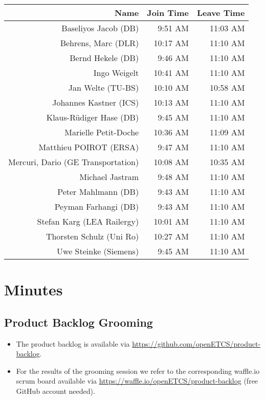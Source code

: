 \documentclass[a4paper, 11pt]{article}
\begin{document}
\begin{table}[htbp]
    \begin{tabular}{rrr}
    \toprule
    \textbf{Name} & \textbf{Join Time} & \textbf{Leave Time} \\
    \midrule
     Baseliyos Jacob (DB) & 9:51 AM & 11:03 AM \\
     Behrens, Marc (DLR) & 10:17 AM & 11:10 AM \\
     Bernd Hekele (DB) & 9:46 AM & 11:10 AM \\
     Ingo Weigelt & 10:41 AM & 11:10 AM \\
     Jan Welte (TU-BS) & 10:10 AM & 10:58 AM \\
     Johannes Kastner (ICS) & 10:13 AM & 11:10 AM \\
     Klaus-R\"udiger Hase (DB) & 9:45 AM & 11:10 AM \\
     Marielle Petit-Doche & 10:36 AM & 11:09 AM \\
     Matthieu POIROT (ERSA) & 9:47 AM & 11:10 AM \\
     Mercuri, Dario (GE Transportation) & 10:08 AM & 10:35 AM \\
     Michael Jastram & 9:48 AM & 11:10 AM \\
     Peter Mahlmann (DB) & 9:43 AM & 11:10 AM \\
     Peyman Farhangi (DB) & 9:43 AM & 11:10 AM \\
     Stefan Karg (LEA Railergy) & 10:01 AM & 11:10 AM \\
     Thorsten Schulz (Uni Ro) & 10:27 AM & 11:10 AM \\
     Uwe Steinke (Siemens) & 9:45 AM & 11:10 AM \\
     \bottomrule
    \end{tabular}%
  \label{tab:addlabel}%
\end{table}%




\section{Minutes}

\subsection{Product Backlog Grooming}
\begin{itemize}
\item The product backlog is available via 
\url{https://github.com/openETCS/product-backlog}. 
\item For the results of the grooming session we refer to the corresponding waffle.io scrum board available via \url{https://waffle.io/openETCS/product-backlog} (free GitHub account needed).
\end{itemize}
\end{document}

